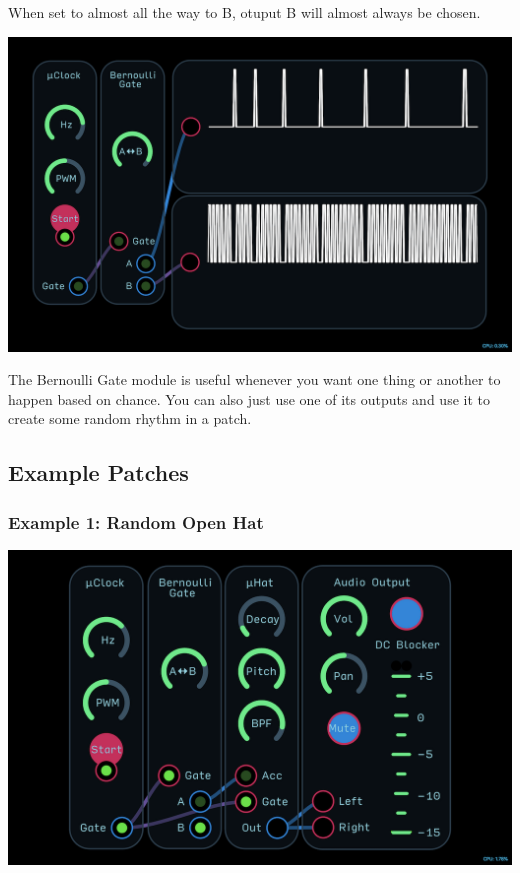 \documentclass[11pt]{book}
\begin{document}
\begin{multicols*}{2}
When set to almost all the way to B, otuput B will almost always be chosen.

\begin{center}
\includegraphics[width=0.95\linewidth]{bernoulli-gate-fig3.png}
\end{center}

The Bernoulli Gate module is useful whenever you want one thing or another to happen based on chance. You can also just use one of its outputs and use it to create some random rhythm in a patch.

\subsection*{Example Patches}

\subsubsection*{Example 1: Random Open Hat}

\begin{center}
\includegraphics[width=0.95\linewidth]{bernoulli-gate-fig4.png}
\end{center}


\end{multicols*}
\end{document}

